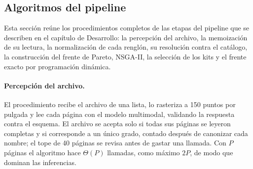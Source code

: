 \subsection{Algoritmos del pipeline}
\label{sec:anexo-algoritmos}

Esta sección reúne los procedimientos completos de las etapas del pipeline que se describen en el
capítulo de Desarrollo: la percepción del archivo, la memoización de su lectura, la normalización de
cada renglón, su resolución contra el catálogo, la construcción del frente de Pareto, NSGA-II, la
selección de los kits y el frente exacto por programación dinámica.

\paragraph{Percepción del archivo.}
El procedimiento recibe el archivo de una lista, lo rasteriza a 150 puntos por pulgada y lee cada
página con el modelo multimodal, validando la respuesta contra el esquema. El archivo se acepta solo
si todas sus páginas se leyeron completas y si corresponde a un único grado, contado después de
canonizar cada nombre; el tope de 40 páginas se revisa antes de gastar una llamada. Con $P$ páginas
el algoritmo hace $\Theta(P)$ llamadas, como máximo $2P$, de modo que dominan las inferencias.

\begin{algorithm}[H]
\caption{Percibir el archivo de una lista, con todas sus páginas o ninguna.}
\label{alg:anexo-percibir}
\small
{}
\end{algorithm}

